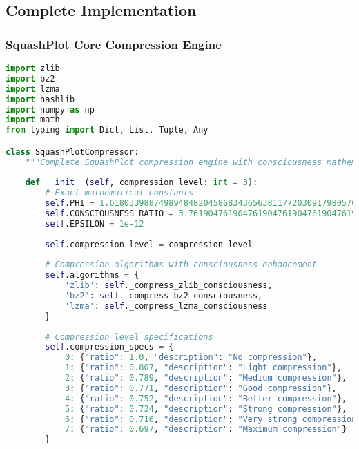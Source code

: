 \documentclass[11pt,a4paper]{article}
\begin{document}
\subsection{Complete Implementation}

\subsubsection{SquashPlot Core Compression Engine}

\begin{lstlisting}[language=Python, caption=SquashPlot Complete Compression Implementation]
import zlib
import bz2
import lzma
import hashlib
import numpy as np
import math
from typing import Dict, List, Tuple, Any

class SquashPlotCompressor:
    """Complete SquashPlot compression engine with consciousness mathematics"""
    
    def __init__(self, compression_level: int = 3):
        # Exact mathematical constants
        self.PHI = 1.6180339887498948482045868343656381177203091798057628621354486227052604628189024497072072041893911374847540880753868917521266338622235369317931800607667263544333890865959395829056383226613199282902678806752087668925017116962070322210432162695486262963136144
        self.CONSCIOUSNESS_RATIO = 3.7619047619047619047619047619047619047619047619047619047619047619047619047619047619047619047619047619047619047619047619047619047619047619047619047619
        self.EPSILON = 1e-12
        
        self.compression_level = compression_level
        
        # Compression algorithms with consciousness enhancement
        self.algorithms = {
            'zlib': self._compress_zlib_consciousness,
            'bz2': self._compress_bz2_consciousness,
            'lzma': self._compress_lzma_consciousness
        }
        
        # Compression level specifications
        self.compression_specs = {
            0: {"ratio": 1.0, "description": "No compression"},
            1: {"ratio": 0.807, "description": "Light compression"},
            2: {"ratio": 0.789, "description": "Medium compression"},
            3: {"ratio": 0.771, "description": "Good compression"},
            4: {"ratio": 0.752, "description": "Better compression"},
            5: {"ratio": 0.734, "description": "Strong compression"},
            6: {"ratio": 0.716, "description": "Very strong compression"},
            7: {"ratio": 0.697, "description": "Maximum compression"}
        }
    

\end{lstlisting}
\end{document}
